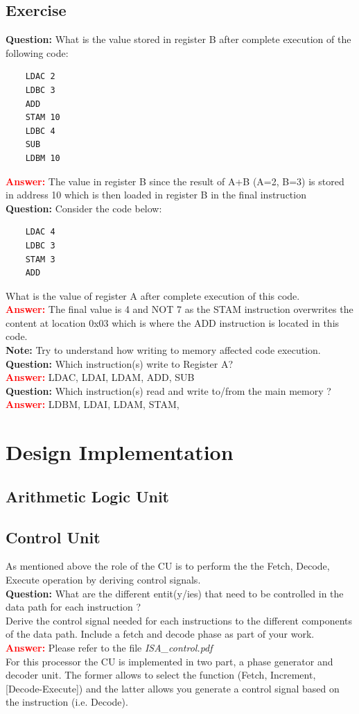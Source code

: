 \documentclass[a4paper, 11pt]{article}
\begin{document}
\subsection{Exercise}

\textbf{Question:} What is the value stored in register B after complete execution of the following code:
\begin{lstlisting}
    LDAC 2
    LDBC 3
    ADD
    STAM 10
    LDBC 4
    SUB
    LDBM 10
\end{lstlisting}
\textcolor{red}{\textbf{Answer:}} The value in register B since the result of A+B (A=2, B=3) is stored in address 10 which is then loaded in register B in the final instruction\\
\textbf{Question:} Consider the code below:
\begin{lstlisting}
    LDAC 4
    LDBC 3
    STAM 3
    ADD
\end{lstlisting}
What is the value of register A after complete execution of this code.\\
\textcolor{red}{\textbf{Answer:}} The final value is 4 and NOT 7 as the STAM instruction overwrites the content at location 0x03 which is where the ADD instruction is located in this code.\\
\textbf{Note:} Try to understand how writing to memory affected code execution.\\
\textbf{Question:} Which instruction(s) write to Register A?\\
\textcolor{red}{\textbf{Answer:}} LDAC, LDAI, LDAM, ADD, SUB\\
\textbf{Question:} Which instruction(s) read and write to/from the main memory ?\\
\textcolor{red}{\textbf{Answer:}} LDBM, LDAI, LDAM, STAM, \\
\section{Design Implementation}
\subsection{Arithmetic Logic Unit}
\subsection{Control Unit}
As mentioned above the role of the CU is to perform the the Fetch, Decode, Execute operation by deriving control signals. \\
\textbf{Question:} What are the different entit(y/ies) that need to be controlled in the data path for each instruction ? \\ 
Derive the control signal needed for each instructions to the different components of the data path. Include a fetch and decode phase as part of your work. \\
\textcolor{red}{\textbf{Answer:}} Please refer to the file \textit{ISA_control.pdf}\\
For this processor the CU is implemented in two part, a phase generator and decoder unit. The former allows to select the function (Fetch, Increment, [Decode-Execute]) and the latter allows you generate a control signal based on the instruction (i.e. Decode).
\end{document}
